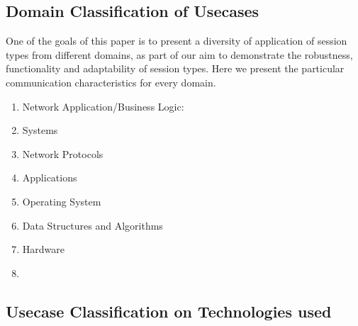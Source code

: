 \begin{comment}
For example Scribble code:
%
\begin{lstlisting}
  msg(int) from A to B;
\end{lstlisting}
%
describes the global protocol between role \lstinline|A| and \lstinline|B|,
where participant \lstinline|A| sends message of type \lstinline|msg(int)|
to participant \lstinline|B|. From the local perspective of participant
\lstinline|A| the protocol would be:
%
\begin{lstlisting}
  msg(int) to B;
\end{lstlisting}
%
where it describes the sending of message \lstinline|msg(int)|
to participant \lstinline|B|.
\end{comment}



\subsection{Domain Classification of Usecases}

One of the goals of this paper is to present a diversity
of application of session types from different domains, as
part of our aim to demonstrate the robustness, functionality
and adaptability of session types. Here we present the particular
communication characteristics for every domain.


\begin{enumerate}
	\item	Network Application/Business Logic:

	\item	Systems

	\item	Network Protocols

	\item	Applications

	\item	Operating System

	\item	Data Structures and Algorithms

	\item	Hardware

	\item	{}
\end{enumerate}


\subsection{Usecase Classification on Technologies used}


